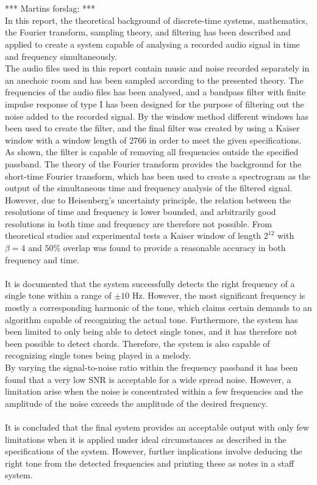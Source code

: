 \\ \\
*** Martins forslag: *** \\
In this report, the theoretical background of discrete-time systems, mathematics, the Fourier transform, sampling theory, and filtering has been described and applied to create a system capable of analysing a recorded audio signal in time and frequency simultaneously.
\\
The audio files used in this report contain music and noise recorded separately in an anechoic room and has been sampled according to the presented theory. The frequencies of the audio files has been analysed, and a bandpass filter with finite impulse response of type I has been designed for the purpose of filtering out the noise added to the recorded signal. By the window method different windows has been used to create the filter, and the final filter was created by using a Kaiser window with a window length of 2766 in order to meet the given specifications. As shown, the filter is capable of removing all frequencies outside the specified passband. The theory of the Fourier transform provides the background for the short-time Fourier transform, which has been used to create a spectrogram as the output of the simultaneous time and frequency analysis of the filtered signal. However, due to Heisenberg's uncertainty principle, the relation between the resolutions of time and frequency is lower bounded, and arbitrarily good resolutions in both time and frequency are therefore not possible. From theoretical studies and experimental tests a Kaiser window of length $2^{12}$ with $\beta = 4$ and $50\%$ overlap was found to provide a reasonable accuracy in both frequency and time.
\\ \\
It is documented that the system successfully detects the right frequency of a single tone within a range of $\pm 10$ Hz. However, the most significant frequency is mostly a corresponding harmonic of the tone, which claims certain demands to an algorithm capable of recognizing the actual tone. Furthermore, the system has been limited to only being able to detect single tones, and it has therefore not been possible to detect chords. Therefore, the system is also capable of recognizing single tones being played in a melody.
\\
By varying the signal-to-noise ratio within the frequency  passband it has been found that a very low SNR is acceptable for a wide spread noise. However, a limitation arise when the noise is concentrated within a few frequencies and the amplitude of the noise exceeds the amplitude of the desired frequency.
\\ \\
It is concluded that the final system provides an acceptable output with only few limitations when it is applied under ideal circumstances as described in the specifications of the system. However, further implications involve deducing the right tone from the detected frequencies and printing these as notes in a staff system.

 